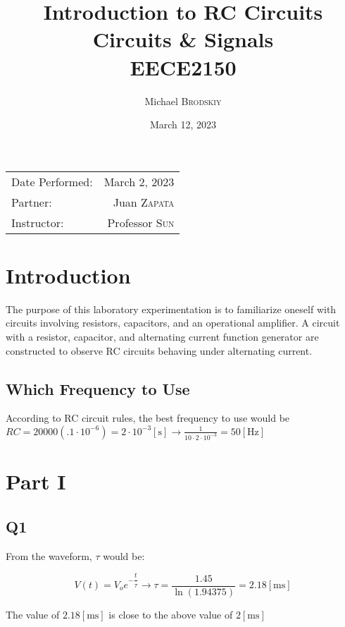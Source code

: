 \documentclass[
	letterpaper, %
	10pt, %
]{CSUniSchoolLabReport}
\title{Introduction to RC Circuits \\ Circuits \& Signals \\ EECE2150} %
\author{Michael \textsc{Brodskiy}}
\date{March 12, 2023} %
\begin{document}
\maketitle %

\begin{center}
	\begin{tabular}{l r}
		Date Performed: & March 2, 2023 \\ %
        Partner: & Juan \textsc{Zapata} \\ %
		Instructor: & Professor \textsc{Sun} %
	\end{tabular}
\end{center}

\setcounter{section}{-1}

\section{Introduction}

The purpose of this laboratory experimentation is to familiarize oneself with circuits involving resistors, capacitors, and an operational amplifier. A circuit with a resistor, capacitor, and alternating current function generator are constructed to observe RC circuits behaving under alternating current.

\subsection{Which Frequency to Use} According to RC circuit rules, the best frequency to use would be $RC=20000(.1\cdot10^{-6})=2\cdot10^{-3}[\si{\second}]\rightarrow\frac{1}{10\cdot2\cdot10^{-3}}=50[\si{\hertz}]$

  \section{Part I}

  \subsection{Q1} From the waveform, $\tau$ would be:

  $$V(t)=V_oe^{-\dfrac{t}{\tau}}\rightarrow\tau=\frac{1.45}{\ln(1.94375)}=2.18[\si{\milli\second}]$$

  The value of $2.18[\si{\milli\second}]$ is close to the above value of $2[\si{\milli\second}]$
\end{document}
